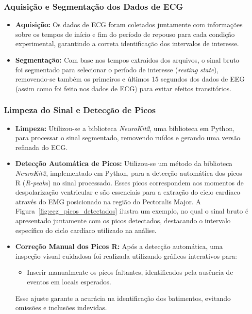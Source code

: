 \subsubsection{Aquisição e Segmentação dos Dados de ECG}
\begin{itemize}
    \item \textbf{Aquisição:} Os dados de ECG foram coletados juntamente com informações sobre os tempos de início e fim do período de repouso para cada condição experimental, garantindo a correta identificação dos intervalos de interesse.
    \item \textbf{Segmentação:} Com base nos tempos extraídos dos arquivos, o sinal bruto foi segmentado para selecionar o período de interesse (\textit{resting state}), removendo-se também os primeiros e últimos 15 segundos dos dados de EEG (assim como foi feito nos dados de ECG) para evitar efeitos transitórios.
\end{itemize}

\subsubsection{Limpeza do Sinal e Detecção de Picos}
\begin{itemize}
    \item \textbf{Limpeza:} Utilizou-se a biblioteca \textit{NeuroKit2}, uma biblioteca em Python, para processar o sinal segmentado, removendo ruídos e gerando uma versão refinada do ECG.
    \item \textbf{Detecção Automática de Picos:} Utilizou-se um método da biblioteca \textit{NeuroKit2}, implementado em Python, para a detecção automática dos picos R (\textit{R-peaks}) no sinal processado. Esses picos correspondem aos momentos de despolarização ventricular e são essenciais para a extração do ciclo cardíaco através do EMG posicionado na região do Pectoralis Major. A Figura~\ref{fig:ecg_picos_detectados} ilustra um exemplo, no qual o sinal bruto é apresentado juntamente com os picos detectados, destacando o intervalo específico do ciclo cardíaco utilizado na análise.
    \item \textbf{Correção Manual dos Picos R:} Após a detecção automática, uma inspeção visual cuidadosa foi realizada utilizando gráficos interativos para:
    \begin{itemize}
        \item Inserir manualmente os picos faltantes, identificados pela ausência de eventos em locais esperados.
    \end{itemize}
    
    Esse ajuste garante a acurácia na identificação dos batimentos, evitando omissões e inclusões indevidas.
\end{itemize}


